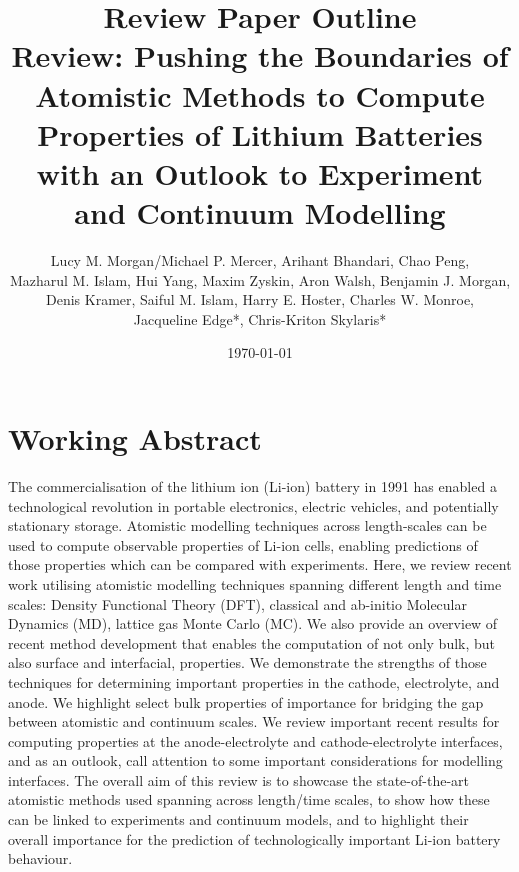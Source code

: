 \documentclass{article}
\title{\textbf{Review Paper Outline} \\ Review: Pushing the Boundaries of Atomistic Methods to Compute Properties of Lithium Batteries with an Outlook to Experiment and Continuum Modelling}
\author{Lucy M. Morgan/Michael P. Mercer, Arihant Bhandari, Chao Peng,\\ Mazharul M. Islam, Hui Yang, Maxim Zyskin, Aron Walsh, Benjamin J. Morgan,\\ Denis Kramer, Saiful M. Islam, Harry E. Hoster, Charles W. Monroe,\\ Jacqueline Edge*, Chris-Kriton Skylaris*}
\date{\today}
\begin{document}
\maketitle

\section*{Working Abstract}
The commercialisation of the lithium ion (Li-ion) battery in 1991 has enabled a technological revolution in portable electronics, electric vehicles, and potentially stationary storage. Atomistic modelling techniques across length-scales can be used to compute observable properties of Li-ion cells, enabling predictions of those properties which can be compared with experiments. Here, we review recent work utilising atomistic modelling techniques spanning different length and time scales: Density Functional Theory (DFT), classical and ab-initio Molecular Dynamics (MD), lattice gas Monte Carlo (MC). We also provide an overview of recent method development that enables the computation of not only bulk, but also surface and interfacial, properties. We demonstrate the strengths of those techniques for determining important properties in the cathode, electrolyte, and anode. We highlight select bulk properties of importance for bridging the gap between atomistic and continuum scales. We review important recent results for computing properties at the anode-electrolyte and cathode-electrolyte interfaces, and as an outlook, call attention to some important considerations for modelling interfaces. The overall aim of this review is to showcase the state-of-the-art atomistic methods used spanning across length/time scales, to show how these can be linked to experiments and continuum models, and to highlight their overall importance for the prediction of technologically important Li-ion battery behaviour.
\end{document}
